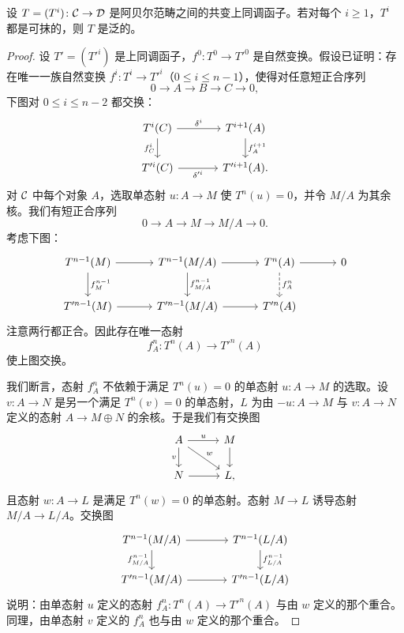 \begin{proposition}\label{it:2.1.4}
设 $T=(T^i)\colon\mathcal{C}\to\mathcal{D}$ 是阿贝尔范畴之间的共变上同调函子。若对每个 $i\ge1$，$T^i$ 都是可抹的，则 $T$ 是泛的。
\end{proposition}
\begin{proof}
设 $T'=(T'^i)$ 是上同调函子，$f^0\colon T^0\to T'^0$ 是自然变换。假设已证明：存在唯一一族自然变换 $f^i\colon T^i\to T'^i$（$0\le i\le n-1$），使得对任意短正合序列
\[
0\to A\to B\to C\to 0,
\]
下图对 $0\le i\le n-2$ 都交换：
\[\begin{tikzcd}[column sep=3.6em,row sep=1.8em]
T^i(C) \arrow[r,"\delta^i"] \arrow[d,"f^i_C"'] & T^{i+1}(A) \arrow[d,"f^{i+1}_A"] \\
T'^i(C) \arrow[r,"\delta'^i"'] & T'^{i+1}(A).
\end{tikzcd}\]
对 $\mathcal{C}$ 中每个对象 $A$，选取单态射 $u\colon A\to M$ 使 $T^n(u)=0$，并令 $M/A$ 为其余核。我们有短正合序列
\[
0\to A\to M\to M/A\to 0.
\]
考虑下图：
\[\begin{tikzcd}[column sep=3.2em,row sep=2.2em]
T^{n-1}(M) \arrow[r] \arrow[d,"f^{n-1}_M"] & T^{n-1}(M/A) \arrow[r] \arrow[d,"f^{n-1}_{M/A}"] & T^n(A) \arrow[r] \arrow[d,dashed,"f^n_A"] & 0 \\
T'^{n-1}(M) \arrow[r] & T'^{n-1}(M/A) \arrow[r] & T'^n(A) &
\end{tikzcd}\]
注意两行都正合。因此存在唯一态射
\[
f^n_A\colon T^n(A)\to T'^n(A)
\]
使上图交换。

我们断言，态射 $f^n_A$ 不依赖于满足 $T^n(u)=0$ 的单态射 $u\colon A\to M$ 的选取。设 $v\colon A\to N$ 是另一个满足 $T^n(v)=0$ 的单态射，$L$ 为由 $-u\colon A\to M$ 与 $v\colon A\to N$ 定义的态射 $A\to M\oplus N$ 的余核。于是我们有交换图
\[\begin{tikzcd}[column sep=2.8em,row sep=1.8em]
A \arrow[r,"u"] \arrow[d,"v"'] \arrow[dr,"w"] & M \arrow[d] \\
N \arrow[r] & L,
\end{tikzcd}\]
且态射 $w\colon A\to L$ 是满足 $T^n(w)=0$ 的单态射。态射 $M\to L$ 诱导态射 $M/A\to L/A$。交换图
\[\begin{tikzcd}[column sep=3.6em,row sep=1.8em]
T^{n-1}(M/A) \arrow[r] \arrow[d,"f^{n-1}_{M/A}"'] & T^{n-1}(L/A) \arrow[d,"f^{n-1}_{L/A}"] \\
T'^{n-1}(M/A) \arrow[r] & T'^{n-1}(L/A)
\end{tikzcd}\]
说明：由单态射 $u$ 定义的态射 $f^n_A\colon T^n(A)\to T'^n(A)$ 与由 $w$ 定义的那个重合。同理，由单态射 $v$ 定义的 $f^n_A$ 也与由 $w$ 定义的那个重合。


\end{proof}
